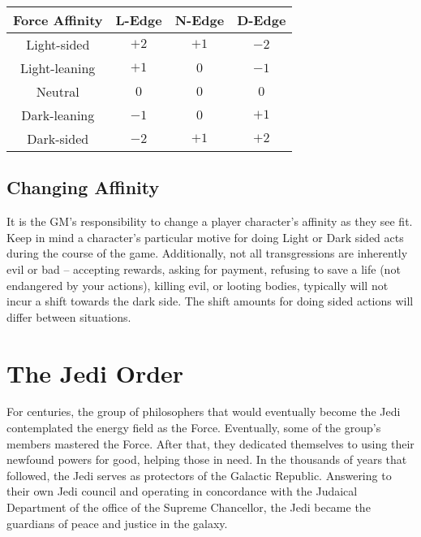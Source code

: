 \documentclass[a4paper,10pt,final,twocolumn,oneside]{book}
\begin{document}
\begin{center}
\begin{tabular}{ |c|c|c|c| }
\hline
\textbf{Force Affinity} & \textbf{L-Edge} & \textbf{N-Edge} & \textbf{D-Edge} \\
\hline \hline
Light-sided 	& $+2$ 	& $+1$ 	& $-2$	\\
\hline
Light-leaning 	& $+1$ 	& $0$ 	& $-1$	\\
\hline
Neutral		 	& $0$ 	& $0$ 	& $0$ 	\\
\hline
Dark-leaning 	& $-1$ 	& $0$ 	& $+1$ 	\\
\hline
Dark-sided 		& $-2$ 	& $+1$ 	& $+2$ 	\\
\hline
\end{tabular}
\end{center}


\subsection{Changing Affinity} %
\label{sub:changing_affinity}

It is the GM's responsibility to change a player character's affinity as they see fit. Keep in mind a character's particular motive for doing Light or Dark sided acts during the course of the game. Additionally, not all transgressions are inherently evil or bad -- accepting rewards, asking for payment, refusing to save a life (not endangered by your actions), killing evil, or looting bodies, typically will not incur a shift towards the dark side. The shift amounts for doing sided actions will differ between situations.


\section{The Jedi Order} %
\label{sec:the_jedi_order}

For centuries, the group of philosophers that would eventually become the Jedi contemplated the energy field as the Force. Eventually, some of the group's members mastered the Force. After that, they dedicated themselves to using their newfound powers for good, helping those in need. In the thousands of years that followed, the Jedi serves as protectors of the Galactic Republic. Answering to their own Jedi council and operating in concordance with the Judaical Department of the office of the Supreme Chancellor, the Jedi became the guardians of peace and justice in the galaxy.
\end{document}
